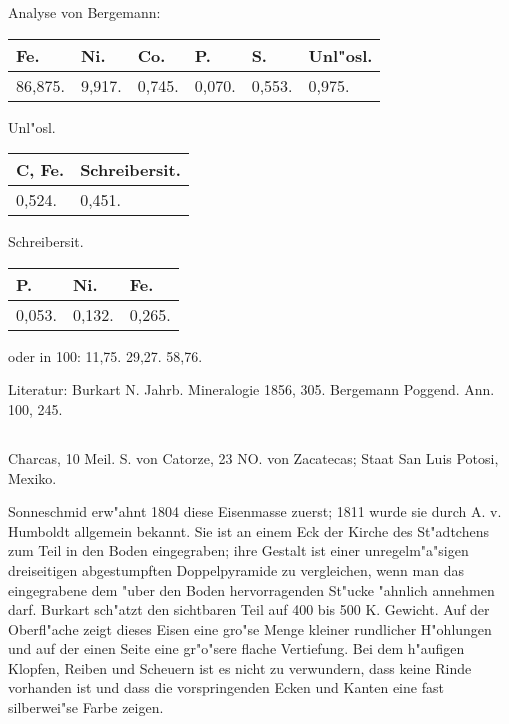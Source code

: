 \documentclass[a4paper, 11pt, oneside]{article}
\begin{document}
Analyse von Bergemann:
\begin{table}[H]
    \centering\swabfamily\Large
    \begin{tabular}{l l l l l l}
        Fe. & Ni. & Co. & P. & S. & Unl"osl. \\ \hline
        86,875. & 9,917. & 0,745. & 0,070. & 0,553. & 0,975. \\
    \end{tabular}
\end{table}

\begin{center}
Unl"osl.
\end{center}

\begin{table}[H]
    \centering\swabfamily\Large
    \begin{tabular}{l l}
        C, Fe. & Schreibersit. \\ \hline
        0,524. & 0,451. \\
    \end{tabular}
\end{table}

\begin{center}
Schreibersit.
\end{center}

\begin{table}[H]
    \centering\swabfamily\Large
    \begin{tabular}{l l l}
        P. & Ni. & Fe. \\ \hline
        0,053. & 0,132. & 0,265. \\
    \end{tabular}
\end{table}

oder in 100: 11,75. 29,27. 58,76.

\normalsize
Literatur: Burkart N. Jahrb. Mineralogie 1856, 305. Bergemann Poggend. Ann. 100, 245.

\subsection{}
\LARGE
\paragraph{}
Charcas, 10 Meil. S. von Catorze, 23 NO. von Zacatecas; Staat San Luis Potosi, Mexiko.

Sonneschmid erw"ahnt 1804 diese Eisenmasse zuerst; 1811 wurde sie durch A. v. Humboldt allgemein bekannt. Sie ist an einem Eck der Kirche des St"adtchens zum Teil in den Boden eingegraben; ihre Gestalt ist einer unregelm"a"sigen dreiseitigen abgestumpften Doppelpyramide zu vergleichen, wenn man das eingegrabene dem "uber den Boden hervorragenden St"ucke "ahnlich annehmen darf. Burkart sch"atzt den sichtbaren Teil auf 400 bis 500 K. Gewicht. Auf der Oberfl"ache zeigt dieses Eisen eine gro"se Menge kleiner rundlicher H"ohlungen und auf der einen Seite eine gr"o"sere flache Vertiefung. Bei dem h"aufigen Klopfen, Reiben und Scheuern ist es nicht zu verwundern, dass keine Rinde vorhanden ist und dass die vorspringenden Ecken und Kanten eine fast silberwei"se Farbe zeigen.
\end{document}
